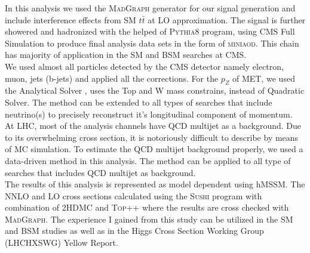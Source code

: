 \documentclass[12pt]{article}
\begin{document}
In this analysis we used the \textsc{MadGraph} generator for our signal generation and include interference effects from SM $t\bar t$ at LO approximation. The signal is further showered and hadronized with the helped of \textsc{Pythia8} program, using CMS Full Simulation to produce final analysis data sets in the form of \textsc{miniaod}. This chain has majority of application in the SM and BSM searches at CMS.\\
We used almost all particles detected by the CMS detector namely electron, muon, jets (b-jets) and applied all the corrections. For the $p_{Z}$ of MET, we used the Analytical Solver \cite{second2}, uses the Top and W mass constrains, instead of Quadratic Solver. The method can be extended to all types of searches that include neutrino(s) to precisely reconstruct it's longitudinal component of momentum.\\
At LHC, most of the analysis channels have QCD multijet as a background. Due to its overwhelming cross section, it is notoriously difficult to describe by means of MC simulation. To estimate the QCD multijet background properly, we used a data-driven method in this analysis. The method can be applied to all type of searches that includes QCD multijet as background.\\ 
The results of this analysis is represented as model dependent using hMSSM. The NNLO and LO cross sections calculated using the \textsc{Sushi} program with combination of \textsc{2HDMC} and \textsc{Top++} where the results are cross checked with \textsc{MadGraph}. The experience I gained from this study can be utilized in the SM and BSM studies as well as in the Higgs Cross Section Working Group (LHCHXSWG) Yellow Report.
\end{document}
